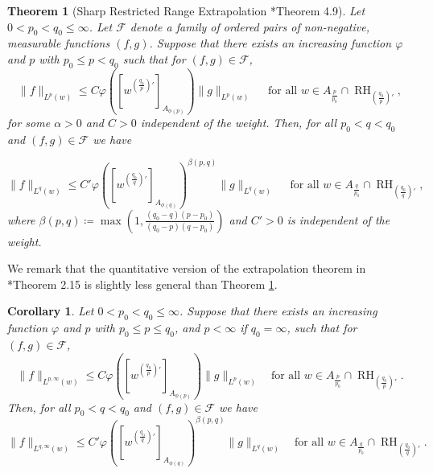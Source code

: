 \documentclass[11pt,reqno]{amsart}
\theoremstyle{plain} %
\newtheorem{theorem}[equation]{Theorem}
\newtheorem{corollary}[equation]{Corollary}
\newcommand{\1}{ \mathbbm{1}}   %
\theoremstyle{definition}
\theoremstyle{remark}
\numberwithin{equation}{section}
\begin{document}
\begin{theorem}[Sharp Restricted Range Extrapolation {\cite{AuscherMartellIGeneral}*{Theorem 4.9}}] 
  \label{thm:Extrapolation} 
  Let $0 < p_{0} < q_{0} \leq \infty$. Let $\mathcal{F} $ denote a family of ordered pairs of non-negative,
measurable functions $(f, g)$. Suppose that there exists an increasing function $\varphi$ and 
  $p$ with $p_{0} \leq p < q_{0}$
  such that for $(f,g) \in \mathcal{F}$,  
  \begin{equation}
 \label{extrapol-q}
    \|f\|_{L^{p}(w)} \leq C \varphi([w^{(\frac{q_{0}}{p})'}]_{A_{\phi(p)}}) \|g\|_{L^{p}(w)}
    \quad \text{ for all } w\in A_{\frac{p}{p_{0}}} \cap \operatorname{RH}_{(\frac{q_{0}}{p})'},
  \end{equation}
  for some $\alpha > 0$ and $C > 0$ independent of the weight.
  Then, for all $p_{0} < q < q_{0}$ and $(f,g) \in \mathcal{F}$ we have
  
  \begin{equation*}
    \|f\|_{L^{q}(w)}
    \leq C' \varphi([w^{(\frac{q_{0}}{q})'}]_{A_{\phi(q)}})^{\beta(p,q)} \|g\|_{L^{q}(w)}
    \quad \text{ for all } w \in A_{\frac{q}{p_{0}}} \cap \operatorname{RH}_{(\frac{q_{0}}{q})'},
  \end{equation*} 
  where $\beta(p,q) \coloneqq \max (1, \frac{(q_{0} - q)(p -
      p_{0})}{(q_{0} - p)(q - p_{0})})$ and $C' > 0$ is independent
  of the weight.
\end{theorem}

 We remark that the quantitative version of the extrapolation theorem in \cite{BBR}*{Theorem 2.15} is slightly less general than Theorem \ref{thm:Extrapolation}.
\begin{corollary}\label{corol:extrapol-weak}
Let $0<p_0<q_0\le \infty$. Suppose that there exists an increasing function $\varphi$ and $p$ with $p_0\le
p\le q_0$, and $p<\infty$ if $q_0=\infty$, such that for $(f,g)\in
\mathcal{F}$,
\begin{equation}\label{extrapol-p:weak}
\|f\|_{L^{p,\infty}(w)}
\le
 C \varphi([w^{(\frac{q_{0}}{p})'}]_{A_{\phi(p)}})\|g\|_{L^{p}(w)}
\quad
\mbox{for all }w\in A_{\frac{p}{p_0}}\cap
\operatorname{RH}_{(\frac{q_0}{p})'}.
\end{equation}
Then, for all $p_0<q<q_0$ and $(f,g)\in\mathcal{F}$ we have
\begin{equation}\label{extrapol-q:weak}
\|f\|_{L^{q,\infty}(w)}
\le
 C' \varphi([w^{(\frac{q_{0}}{q})'}]_{A_{\phi(q)}})^{\beta(p,q)} \|g\|_{L^{q}(w)}
\quad
\mbox{for all }w\in A_{\frac{q}{p_0}}\cap
\operatorname{RH}_{(\frac{q_0}{q})'}.
\end{equation}
\end{corollary}
\end{document}
